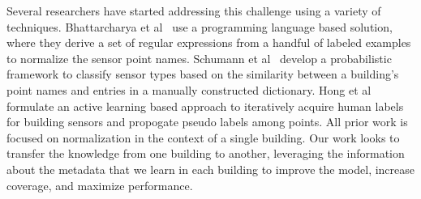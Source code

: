 Several researchers have started addressing this challenge using a variety of techniques.
Bhattarcharya et al~\cite{arka} use a programming language based solution, 
where they derive a set of regular expressions from a handful of labeled examples 
to normalize the sensor point names. 
Schumann et al~\cite{ibm} develop a probabilistic framework to classify sensor types 
based on the similarity between a building's point names and entries in a manually constructed dictionary. 
Hong et al~\cite{cikm} formulate an active learning based approach to iteratively 
acquire human labels for building sensors and propogate pseudo labels among points.
All prior work is focused on normalization in the context of a single building.  Our work looks to 
transfer the knowledge from one building to another, leveraging the information about the metadata that
we learn in each building to improve the model, increase coverage, and maximize performance.



